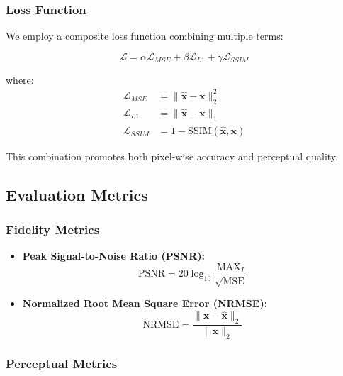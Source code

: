 \documentclass[11pt,a4paper]{article}
\begin{document}
\subsubsection{Loss Function}

We employ a composite loss function combining multiple terms:

\begin{equation}
\mathcal{L} = \alpha \mathcal{L}_{MSE} + \beta \mathcal{L}_{L1} + \gamma \mathcal{L}_{SSIM}
\end{equation}

where:
\begin{align}
\mathcal{L}_{MSE} &= \|\hat{\mathbf{x}} - \mathbf{x}\|_2^2 \\
\mathcal{L}_{L1} &= \|\hat{\mathbf{x}} - \mathbf{x}\|_1 \\
\mathcal{L}_{SSIM} &= 1 - \text{SSIM}(\hat{\mathbf{x}}, \mathbf{x})
\end{align}

This combination promotes both pixel-wise accuracy and perceptual quality.

\subsection{Evaluation Metrics}

\subsubsection{Fidelity Metrics}

\begin{itemize}
    \item \textbf{Peak Signal-to-Noise Ratio (PSNR):}
    \begin{equation}
    \text{PSNR} = 20 \log_{10} \frac{\text{MAX}_I}{\sqrt{\text{MSE}}}
    \end{equation}
    
    \item \textbf{Normalized Root Mean Square Error (NRMSE):}
    \begin{equation}
    \text{NRMSE} = \frac{\|\mathbf{x} - \hat{\mathbf{x}}\|_2}{\|\mathbf{x}\|_2}
    \end{equation}
\end{itemize}

\subsubsection{Perceptual Metrics}
\end{document}
